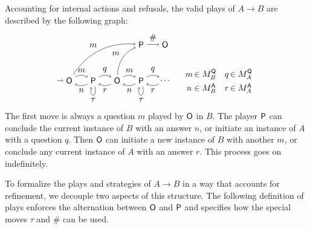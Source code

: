Accounting for internal actions and refusals,
the valid plays of $A \rightarrow B$
are described by the following graph:
\[
  \begin{tikzpicture}[baseline=(O1.base)]
    \node (O1) at (0,0) {\kw{O}};
    \node (P1) at (1,0) {\kw{P}};
    \node (O2) at (2,0) {\kw{O}};
    \node (P2) at (3,0) {\kw{P}};
    \node (O3) at (4,0) {$\ldots$};
    \node (R) at (3,1.5) {\kw{P}};
    \node (H) at (4,1.5) {$\kw{O}$};
    \path [->] (R) edge node[auto] {$\#$} (H);
    \path [->] (-0.5,0) edge (O1);
    \path [->] (O1) edge[bend left] node[auto] {$m$} (P1);
    \path [->] (O1) edge[bend left] node[auto] {$m$} (R);
    \path [->] (P1) edge[bend left] node[auto] {$n$} (O1);
    \path [->] (P1) edge[bend left] node[auto] {$q$} (O2);
    \path [->] (P1) edge[loop below] node[auto] {$\tau$} (P1);
    \path [->] (O2) edge[bend left] node[auto] {$r$} (P1);
    \path [->] (O2) edge[bend left] node[auto] {$m$} (P2);
    \path [->] (O2) edge[bend left] node[auto] {$m$} (R);
    \path [->] (P2) edge[bend left] node[auto] {$n$} (O2);
    \path [->] (P2) edge[bend left] node[auto] {$q$} (O3);
    \path [->] (P2) edge[loop below] node[auto] {$\tau$} (P2);
    \path [->] (O3) edge[bend left] node[auto] {$r$} (P2);
  \end{tikzpicture}
  \quad
  \begin{array}{c@{\,}lc@{\,}l}
    m &\in M_B^\kw{Q} & q &\in M_A^\kw{Q} \\[1ex]
    n &\in M_B^\kw{A} & r &\in M_A^\kw{A}
  \end{array}
\]
The first move is always a question $m$ played by $ \mathsf{O} $ in $B$.
The player $ \mathsf{P} $ can conclude the current instance of $B$
with an answer $n$, or
initiate an instance of $A$
with a question $q$.
Then $ \mathsf{O} $ can initiate a new instance of $B$
with another $m$, or
conclude any current instance of $A$
with an answer $r$.
This process goes on indefinitely.

To formalize the plays and strategies of $A \rightarrow B$
in a way that accounts for refinement,
we decouple two aspects of this structure.
The following definition of plays
enforces the alternation between $ \mathsf{O} $ and $ \mathsf{P} $
and specifies how the special moves $\tau$ and $\#$ can be used.

